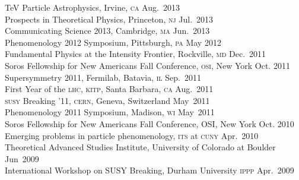\documentclass[margin,line]{resume}
\newcommand{\scap}[1]{\textsc{\MakeLowercase{#1}}}
\begin{document}
\begin{resume}
%
TeV Particle Astrophysics, Irvine, \scap{CA }
\hfill Aug.~2013\vspace{.7mm}\\
%
Prospects in Theoretical Physics, Princeton, \scap{NJ}
\hfill Jul.~2013\vspace{.7mm}\\
%
Communicating Science 2013, Cambridge, \scap{MA}
\hfill Jun.~2013\vspace{.7mm}\\
%
Phenomenology 2012 Symposium, Pittsburgh, \scap{PA}
\hfill May 2012\vspace{.7mm}\\
%
Fundamental Physics at the Intensity Frontier, Rockville, \scap{MD}
\hfill Dec.~2011\vspace{.7mm}\\
%
Soros Fellowship for New Americans Fall Conference, \scap{OSI}, New York 
\hfill 
Oct. 2011\vspace{.7mm}\\
%
Supersymmetry 2011, Fermilab, Batavia, \scap{IL}
\hfill 
Sep.~2011\vspace{.7mm}\\
%
First Year of the \scap{LHC}, \scap{KITP}, Santa Barbara, \scap{CA}
\hfill 
Aug.~2011\vspace{.7mm}\\
%
\scap{SUSY} Breaking '11, \scap{CERN}, Geneva, Switzerland
\hfill
May~2011\vspace{.7mm}\\
%
Phenomenology 2011 Symposium, Madison, \scap{WI}
\hfill 
May~2011\vspace{.7mm}\\
%
Soros Fellowship for New Americans Fall Conference, OSI, New York
\hfill 
Oct. 2010\vspace{.7mm}\\
% 
Emerging problems in particle phenomenology, \scap{ITS} at \scap{CUNY}
\hfill 
Apr.~2010\vspace{.7mm}\\
%
Theoretical Advanced Studies Institute, University of Colorado at Boulder
\hfill 
Jun~2009\vspace{.7mm}\\
%
International Workshop on SUSY Breaking, Durham University \scap{IPPP}
\hfill 
Apr.~2009\vspace{.7mm}\\

\end{resume}
\end{document}
